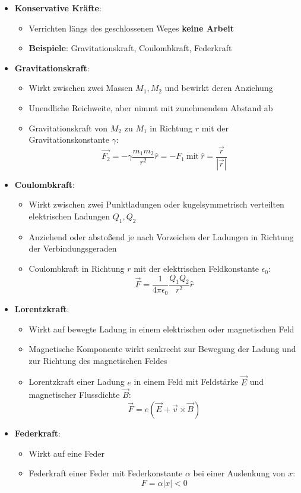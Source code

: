 \begin{itemize}
	\item \textbf{Konservative Kräfte}:
	\begin{itemize}
		\item Verrichten längs des geschlossenen Weges \textbf{keine Arbeit}
		\item \textbf{Beispiele}: Gravitationskraft, Coulombkraft, Federkraft
	\end{itemize}
	\item \textbf{Gravitationskraft}:
	\begin{itemize}
		\item Wirkt zwischen zwei Massen $M_1, M_2$ und bewirkt deren Anziehung
		\item Unendliche Reichweite, aber nimmt mit zunehmendem Abstand ab
		\item Gravitationskraft von $M_2$ zu $M_1$ in Richtung $r$ mit der Gravitationskonstante $\gamma$: $$\vec{F_2} = -\gamma\frac{m_1m_2}{r^2}\hat{r} = -F_1\ \text{mit}\ \hat{r} = \frac{\vec{r}}{|\vec{r}|}$$
	\end{itemize}
	\item \textbf{Coulombkraft}:
	\begin{itemize}
		\item Wirkt zwischen zwei Punktladungen oder kugelsymmetrisch verteilten elektrischen Ladungen $Q_1, Q_2$
		\item Anziehend oder abstoßend je nach Vorzeichen der Ladungen in Richtung der Verbindungsgeraden
		\item Coulombkraft in Richtung $r$ mit der elektrischen Feldkonstante $\epsilon_0$: $$\vec{F} = \frac{1}{4\pi\epsilon_0}\frac{Q_1Q_2}{r^2}\hat{r}$$
	\end{itemize}
	\newpage
	\item \textbf{Lorentzkraft}:
	\begin{itemize}
		\item Wirkt auf bewegte Ladung in einem elektrischen oder magnetischen Feld
		\item Magnetische Komponente wirkt senkrecht zur Bewegung der Ladung und zur Richtung des magnetischen Feldes
		\item Lorentzkraft einer Ladung $e$ in einem Feld mit Feldstärke $\vec{E}$ und magnetischer Flussdichte $\vec{B}$: $$\vec{F} = e(\vec{E} + \vec{v} \times \vec{B})$$
	\end{itemize}
	\item \textbf{Federkraft}:
	\begin{itemize}
		\item Wirkt auf eine Feder
		\item Federkraft einer Feder mit Federkonstante $\alpha$ bei einer Auslenkung von $x$: $$F = \alpha|x| < 0$$
	\end{itemize}
\end{itemize}

